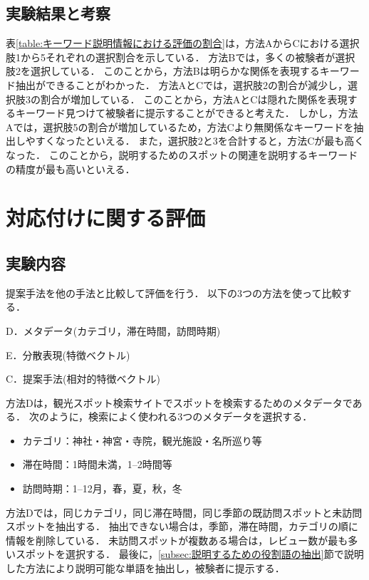 \documentclass[submit,techrep,noauthor]{ipsj}
\begin{document}
\subsection{実験結果と考察}
表\ref{table:キーワード説明情報における評価の割合}は，方法AからCにおける選択肢1から5それぞれの選択割合を示している．
方法Bでは，多くの被験者が選択肢2を選択している．
このことから，方法Bは明らかな関係を表現するキーワード抽出ができることがわかった．
方法AとCでは，選択肢2の割合が減少し，選択肢3の割合が増加している．
このことから，方法AとCは隠れた関係を表現するキーワード見つけて被験者に提示することができると考えた．
しかし，方法Aでは，選択肢5の割合が増加しているため，方法Cより無関係なキーワードを抽出しやすくなったといえる．
また，選択肢2と3を合計すると，方法Cが最も高くなった．
このことから，説明するためのスポットの関連を説明するキーワードの精度が最も高いといえる．

\section{対応付けに関する評価}
\label{sec:対応付けに関する評価}
\subsection{実験内容}
提案手法を他の手法と比較して評価を行う．
以下の3つの方法を使って比較する．
\begin{description}
  \item D．メタデータ(カテゴリ，滞在時間，訪問時期)
  \item E．分散表現(特徴ベクトル)
  \item C．提案手法(相対的特徴ベクトル)
\end{description}

方法Dは，観光スポット検索サイトでスポットを検索するためのメタデータである．
次のように，検索によく使われる3つのメタデータを選択する．
\begin{itemize}
 \item カテゴリ：神社・神宮・寺院，観光施設・名所巡り等
 \item 滞在時間：1時間未満，1--2時間等
 \item 訪問時期：1--12月，春，夏，秋，冬
\end{itemize}

方法Dでは，同じカテゴリ，同じ滞在時間，同じ季節の既訪問スポットと未訪問スポットを抽出する．
抽出できない場合は，季節，滞在時間，カテゴリの順に情報を削除している．
未訪問スポットが複数ある場合は，レビュー数が最も多いスポットを選択する．
最後に，\ref{subsec:説明するための役割語の抽出}節で説明した方法により説明可能な単語を抽出し，被験者に提示する．
\end{document}

